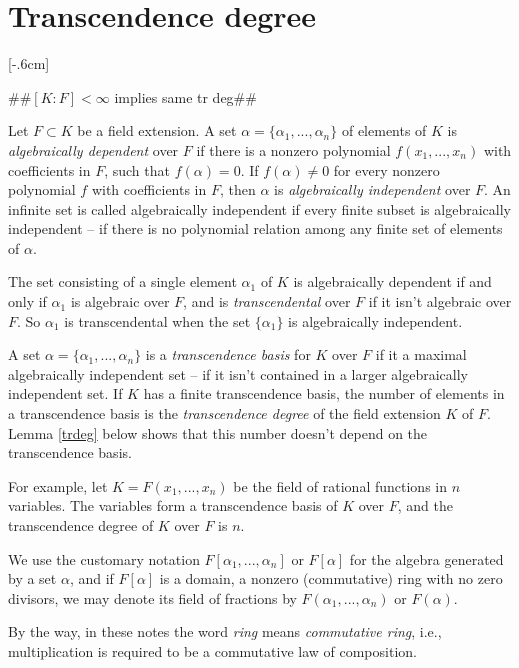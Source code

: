 \documentclass[leqno]{book}
\newcommand\Marginnote[1]{\marginnote{\hspace{-12pt}\normalfont{#1}}}
\theoremstyle{definition}%
\numberwithin{equation}{section}
\theoremstyle{theorem} %
\begin{document}
\section{Transcendence degree} 
\label{transcdeg}
\Marginnote{transcdeg}[-.6cm] 

\#\#$[K:F] < \infty$ implies same tr deg\#\#


\msno Let $F\subset K$ be a field extension.  A set $\alpha =
\{\alpha_1,...,\alpha_n\}$ of elements of $K$ is {\it algebraically
  dependent} over $F$ if there is a nonzero polynomial
$f(x_1,...,x_n)$ with coefficients in $F$, such that $f(\alpha)=0$.
If $f(\alpha)\neq 0$ for every nonzero polynomial $f$ with
coefficients in $F$, then $\alpha$ is {\it algebraically independent}
  over $F$.  An infinite set is called algebraically independent if
every finite subset is algebraically independent -- if
there is no polynomial relation among any finite set of elements of
$\alpha$.

The set consisting of a single element $\alpha_1$ of $K$ is
algebraically dependent if and only if $\alpha_1$ is algebraic over
$F$, and is {\it transcendental} over $F$ if it isn't algebraic over
$F$.  So $\alpha_1$ is transcendental when the set $\{\alpha_1\}$ is
algebraically independent.

A set $\alpha = \{\alpha_1,...,\alpha_n\}$ is a {\it transcendence
  basis} for $K$ over $F$ if it a maximal algebraically independent
set   -- if it isn't contained in a larger algebraically independent
set. 
  If $K$ has a finite transcendence basis, the number
of elements in a transcendence basis is the {\it transcendence degree}
of the field extension $K$ of $F$. Lemma \ref{trdeg} below shows that this
number doesn't depend on  the transcendence basis.

 For example, let $K=F(x_1,...,x_n)$ be the field of rational
 functions in $n$ variables.  The variables form a
 transcendence basis of $K$ over $F$, and the transcendence degree of
 $K$ over $F$ is $n$.

\ms We use the customary notation $F[\alpha_1,...,\alpha_n]$ or
$F[\alpha]$ for the algebra generated by a set $\alpha$, and if
$F[\alpha]$ is a domain, a nonzero (commutative) ring with no zero
divisors, we may denote its field of fractions by
$F(\alpha_1,...,\alpha_n)$ or $F(\alpha)$.

\ms By the way, in these notes the word {\it ring} means {\it
  commutative ring}, i.e., multiplication is required to be a
commutative law of composition.
\end{document}
